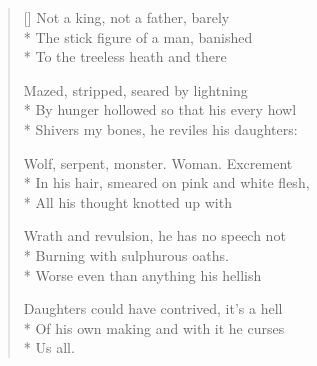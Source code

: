 \label{ch:lear_ba}
\settowidth{\versewidth}{In his hair, smeared on pink and white flesh,}
\begin{verse}[\versewidth]
 Not a king, not a father, barely\\*
The stick figure of a man, banished\\*
To the treeless heath and there

Mazed, stripped, seared by lightning\\*
By hunger hollowed so that his every howl\\*
Shivers my bones, he reviles his daughters:

Wolf, serpent, monster.  Woman. Excrement\\*
In his hair, smeared on pink and white flesh,\\*
All his thought knotted up with

Wrath and revulsion, he has no speech not\\*
Burning with sulphurous oaths.\\*
Worse even than anything his hellish

Daughters could have contrived, it's a hell\\*
Of his own making and with it he curses\\*
Us all.
\end{verse}
